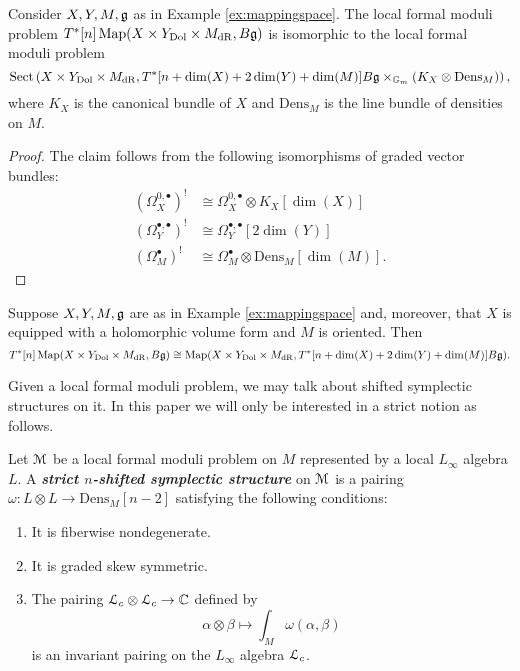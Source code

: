 \documentclass[10pt, oneside]{article}
\newcommand{\Dens}{\mathrm{Dens}}
\newcommand{\Gm}{\mathbb{G}_m}
\newcommand{\Sect}{\mathrm{Sect}}
\newcommand{\defterm}[1]{\textbf{\emph{#1}}}
\begin{document}
\begin{prop}
Consider $X,Y,M, \mathfrak g$ as in Example \ref{ex:mappingspace}. The local formal moduli problem $T^*[n]\operatorname{Map}(X\times Y_{\mathrm{Dol}}\times M_{\mathrm{dR}}, B\mathfrak g)$ is isomorphic to the local formal moduli problem
\[\Sect\left(X\times Y_{\mathrm{Dol}}\times M_{\mathrm{dR}}, T^*[n+\dim(X)+2\dim(Y)+\dim(M)] B\fg\times_{\Gm} (K_X\otimes \Dens_M)\right),\]
where $K_X$ is the canonical bundle of $X$ and $\Dens_M$ is the line bundle of densities on $M$.
\label{prop:mapintocotangent}
\end{prop}
\begin{proof}
The claim follows from the following isomorphisms of graded vector bundles:
\begin{align*}
\left(\Omega^{0, \bullet}_X\right)^!&\cong \Omega^{0, \bullet}_X\otimes K_X[\dim(X)] \\
\left(\Omega^{\bullet, \bullet}_Y\right)^!&\cong \Omega^{\bullet, \bullet}_Y[2\dim(Y)] \\
\left(\Omega^\bullet_M\right)^!&\cong \Omega^\bullet_M\otimes \Dens_M[\dim(M)].
\end{align*}
\end{proof}

\begin{corollary}
Suppose $X,Y,M,\mathfrak g$ are as in Example \ref{ex:mappingspace} and, moreover, that $X$ is equipped with a holomorphic volume form and $M$ is oriented. Then
\[T^*[n]\operatorname{Map}(X\times Y_{\mathrm{Dol}}\times M_{\mathrm{dR}}, B\mathfrak g)\cong \operatorname{Map}(X\times Y_{\mathrm{Dol}}\times M_{\mathrm{dR}}, T^*[n+\dim(X)+2\dim(Y)+\dim(M)] B\mathfrak g).\]
\label{cor:mapintocotangent}
\end{corollary}

Given a local formal moduli problem, we may talk about shifted symplectic structures \cite{PTVV} on it. In this paper we will only be interested in a strict notion as follows.

\begin{definition}
Let $\mathcal M$ be a local formal moduli problem on $M$ represented by a local $L_\infty$ algebra $L$. A \defterm{strict $n$-shifted symplectic structure} on $\mathcal M$ is a pairing $\omega\colon L\otimes L\rightarrow \Dens_M[n-2]$ satisfying the following conditions:
\begin{enumerate}
\item It is fiberwise nondegenerate.

\item It is graded skew symmetric.

\item The pairing $\mathcal L_c\otimes \mathcal L_c \rightarrow \mathbb C$ defined by
\[\alpha\otimes \beta \mapsto \int_M \omega( \alpha, \beta)\]
is an invariant pairing on the $L_\infty$ algebra $\mathcal L_c$.
\end{enumerate}
\end{definition}
\end{document}
